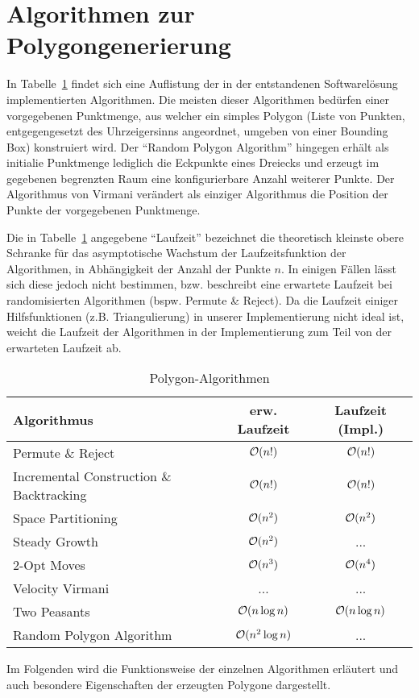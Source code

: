 \section{Algorithmen zur Polygongenerierung}

  In Tabelle~\ref{algo_table} findet sich eine Auflistung der in der
  entstandenen Softwarelösung implementierten Algorithmen. Die meisten dieser
  Algorithmen bedürfen einer vorgegebenen Punktmenge, aus welcher ein simples
  Polygon (Liste von Punkten, entgegengesetzt des Uhrzeigersinns angeordnet, 
  umgeben von einer Bounding Box) konstruiert wird. Der 
  \enquote{Random Polygon Algorithm} hingegen
  erhält als initialie Punktmenge lediglich die Eckpunkte eines Dreiecks und
  erzeugt im gegebenen begrenzten Raum eine konfigurierbare Anzahl weiterer
  Punkte. Der Algorithmus von Virmani verändert als einziger Algorithmus die
  Position der Punkte der vorgegebenen Punktmenge.

  Die in Tabelle~\ref{algo_table} angegebene \enquote{Laufzeit} bezeichnet die
  theoretisch kleinste obere Schranke für das asymptotische Wachstum der
  Laufzeitsfunktion der Algorithmen, in Abhängigkeit der Anzahl der Punkte $n$.
  In einigen Fällen lässt sich diese jedoch nicht bestimmen, bzw. beschreibt
  eine erwartete Laufzeit bei randomisierten Algorithmen (bspw. Permute \&
  Reject). Da die Laufzeit einiger Hilfsfunktionen (z.B. Triangulierung) in 
  unserer Implementierung nicht ideal ist, weicht die
  Laufzeit der Algorithmen in der Implementierung zum Teil von der erwarteten
  Laufzeit ab.

  \begin{table}[ht]
    \begin{center}
    \caption{Polygon-Algorithmen}
    \begin{tabular}{lcc} 
      \toprule
      Algorithmus & erw. Laufzeit & Laufzeit (Impl.) \\
      \midrule
      Permute \& Reject & $\mathcal{O}(n!)$ & $\mathcal{O}(n!)$ \\
      Incremental Construction \& Backtracking & $\mathcal{O}(n!)$ & $\mathcal{O}(n!)$ \\
      Space Partitioning & $\mathcal{O}(n^2)$ & $\mathcal{O}(n^2)$\\
      Steady Growth & $\mathcal{O}(n^2)$ & ... \\
      2-Opt Moves & $\mathcal{O}(n^3)$ & $\mathcal{O}(n^4)$ \\
      Velocity Virmani & ... & ...\\
      Two Peasants & $\mathcal{O}(n \log n)$ & $\mathcal{O}(n \log n)$ \\
      Random Polygon Algorithm & $\mathcal{O}(n^2 \log n)$ & ... \\
      \bottomrule
    \end{tabular}
    \label{algo_table}
    \end{center}
  \end{table}

  Im Folgenden wird die Funktionsweise der einzelnen Algorithmen erläutert und
  auch besondere Eigenschaften der erzeugten Polygone dargestellt.


